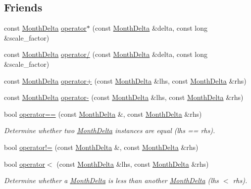 \subsection*{Friends}
\begin{DoxyCompactItemize}
\item 
const \hyperlink{structMonthDelta}{Month\-Delta} \hyperlink{structMonthDelta_a8ec4e463ca75d4336f7793f9263ec8b5}{operator$\ast$} (const \hyperlink{structMonthDelta}{Month\-Delta} \&delta, const long \&scale\-\_\-factor)
\item 
const \hyperlink{structMonthDelta}{Month\-Delta} \hyperlink{structMonthDelta_adc685a1884457238d5742f06d66ab8d3}{operator/} (const \hyperlink{structMonthDelta}{Month\-Delta} \&delta, const long \&scale\-\_\-factor)
\item 
const \hyperlink{structMonthDelta}{Month\-Delta} \hyperlink{structMonthDelta_a9f7f420c48017d9fecdcebc1864fdcad}{operator+} (const \hyperlink{structMonthDelta}{Month\-Delta} \&lhs, const \hyperlink{structMonthDelta}{Month\-Delta} \&rhs)
\item 
const \hyperlink{structMonthDelta}{Month\-Delta} \hyperlink{structMonthDelta_aee1cce9ecf1c7d81fb306bf791cc22f1}{operator-\/} (const \hyperlink{structMonthDelta}{Month\-Delta} \&lhs, const \hyperlink{structMonthDelta}{Month\-Delta} \&rhs)
\item 
bool \hyperlink{structMonthDelta_a9edf8fc83e1d85f6973698f907671f2d}{operator==} (const \hyperlink{structMonthDelta}{Month\-Delta} \&, const \hyperlink{structMonthDelta}{Month\-Delta} \&rhs)
\begin{DoxyCompactList}\small\item\em Determine whether two \hyperlink{structMonthDelta}{Month\-Delta} instances are equal (lhs == rhs). \end{DoxyCompactList}\item 
bool \hyperlink{structMonthDelta_a4af85af4ca025c7850dc65b9ec909c67}{operator!=} (const \hyperlink{structMonthDelta}{Month\-Delta} \&, const \hyperlink{structMonthDelta}{Month\-Delta} \&rhs)
\item 
bool \hyperlink{structMonthDelta_a6f3a37e7ae7d150527288eb9bca5ba32}{operator$<$} (const \hyperlink{structMonthDelta}{Month\-Delta} \&lhs, const \hyperlink{structMonthDelta}{Month\-Delta} \&rhs)
\begin{DoxyCompactList}\small\item\em Determine whether a \hyperlink{structMonthDelta}{Month\-Delta} is less than another \hyperlink{structMonthDelta}{Month\-Delta} (lhs $<$ rhs). \end{DoxyCompactList}\item 

\end{DoxyCompactItemize}
